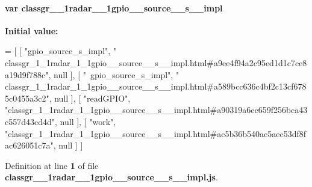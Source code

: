\paragraph[{classgr\+\_\+1\+\_\+1radar\+\_\+1\+\_\+1gpio\+\_\+\+\_\+source\+\_\+\+\_\+s\+\_\+\+\_\+impl}]{\setlength{\rightskip}{0pt plus 5cm}var classgr\+\_\+\_\+1radar\+\_\+\_\+1gpio\+\_\+\+\_\+source\+\_\+\+\_\+s\+\_\+\+\_\+impl}\label{classgr__1__1radar__1__1gpio____source____s____impl_8js_a2b4639c01672ccf882622a0ca692d669}
{\bfseries Initial value\+:}
\begin{DoxyCode}
=
[
    [ \textcolor{stringliteral}{"gpio\_source\_s\_impl"}, \textcolor{stringliteral}{"
      classgr\_1\_1radar\_1\_1gpio\_\_source\_\_s\_\_impl.html#a9ee4f94a2c95ed1d1c7ce8a19d9f788c"}, null ],
    [ \textcolor{stringliteral}{"~gpio\_source\_s\_impl"}, \textcolor{stringliteral}{"
      classgr\_1\_1radar\_1\_1gpio\_\_source\_\_s\_\_impl.html#a589bcc636c4bf2c13cf6785c0455a3c2"}, null ],
    [ \textcolor{stringliteral}{"readGPIO"}, \textcolor{stringliteral}{"classgr\_1\_1radar\_1\_1gpio\_\_source\_\_s\_\_impl.html#a90319a6ec659f256bca43c557d43cd4d"}, null 
      ],
    [ \textcolor{stringliteral}{"work"}, \textcolor{stringliteral}{"classgr\_1\_1radar\_1\_1gpio\_\_source\_\_s\_\_impl.html#ac5b36b540ac5aec53df8fac626051c7a"}, null ]
]
\end{DoxyCode}


Definition at line {\bf 1} of file {\bf classgr\+\_\+\_\+1radar\+\_\+\_\+1gpio\+\_\+\+\_\+source\+\_\+\+\_\+s\+\_\+\+\_\+impl.\+js}.

